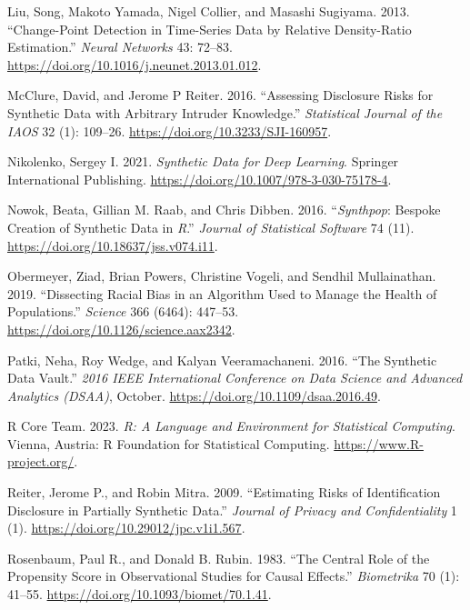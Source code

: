 \documentclass[
]{template/style/uneceart}
\newlength{\cslhangindent}
\newlength{\cslentryspacingunit} %
\newenvironment{CSLReferences}[2] %
 {%
  \setlength{\parindent}{0pt}
  \ifodd #1
  \let\oldpar\par
  \def\par{\hangindent=\cslhangindent\oldpar}
  \fi
  \setlength{\parskip}{#2\cslentryspacingunit}
 }%
 {}
\begin{document}
\begin{CSLReferences}{1}{0}
\leavevmode{}%
Liu, Song, Makoto Yamada, Nigel Collier, and Masashi Sugiyama. 2013.
{``Change-Point Detection in Time-Series Data by Relative Density-Ratio
Estimation.''} \emph{Neural Networks} 43: 72--83.
\url{https://doi.org/10.1016/j.neunet.2013.01.012}.

\leavevmode{}%
McClure, David, and Jerome P Reiter. 2016. {``Assessing Disclosure Risks
for Synthetic Data with Arbitrary Intruder Knowledge.''}
\emph{Statistical Journal of the IAOS} 32 (1): 109--26.
\url{https://doi.org/10.3233/SJI-160957}.

\leavevmode{}%
Nikolenko, Sergey I. 2021. \emph{Synthetic Data for Deep Learning}.
Springer International Publishing.
\url{https://doi.org/10.1007/978-3-030-75178-4}.

\leavevmode{}%
Nowok, Beata, Gillian M. Raab, and Chris Dibben. 2016.
{``{\emph{Synthpop}:} Bespoke Creation of Synthetic Data in
{\emph{R}}.''} \emph{Journal of Statistical Software} 74 (11).
\url{https://doi.org/10.18637/jss.v074.i11}.

\leavevmode{}%
Obermeyer, Ziad, Brian Powers, Christine Vogeli, and Sendhil
Mullainathan. 2019. {``Dissecting Racial Bias in an Algorithm Used to
Manage the Health of Populations.''} \emph{Science} 366 (6464): 447--53.
\url{https://doi.org/10.1126/science.aax2342}.

\leavevmode{}%
Patki, Neha, Roy Wedge, and Kalyan Veeramachaneni. 2016. {``The
Synthetic Data Vault.''} \emph{2016 IEEE International Conference on
Data Science and Advanced Analytics (DSAA)}, October.
\url{https://doi.org/10.1109/dsaa.2016.49}.

\leavevmode{}%
R Core Team. 2023. \emph{R: A Language and Environment for Statistical
Computing}. Vienna, Austria: R Foundation for Statistical Computing.
\url{https://www.R-project.org/}.

\leavevmode{}%
Reiter, Jerome P., and Robin Mitra. 2009. {``Estimating Risks of
Identification Disclosure in Partially Synthetic Data.''} \emph{Journal
of Privacy and Confidentiality} 1 (1).
\url{https://doi.org/10.29012/jpc.v1i1.567}.

\leavevmode{}%
Rosenbaum, Paul R., and Donald B. Rubin. 1983. {``The Central Role of
the Propensity Score in Observational Studies for Causal Effects.''}
\emph{Biometrika} 70 (1): 41--55.
\url{https://doi.org/10.1093/biomet/70.1.41}.


\end{CSLReferences}
\end{document}
